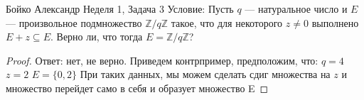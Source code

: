 \documentclass[a4paper,12pt]{article}
\numberwithin{equation}{section}
\theoremstyle{plain}
\theoremstyle{definition}
\theoremstyle{remark}
\def\Z{\mathbb {Z}}
\begin{document}

Бойко Александр
\newline
\newline
Неделя 1, Задача 3 \newline
Условие:
Пусть $q$ --- натуральное число и $E$ --- произвольное подмножество $\Z/q\Z$ такое, что для некоторого $z\neq 0$ выполнено $E+z\subseteq E$.
Верно ли, что тогда $E=\Z/q\Z$?
\begin{proof}
Ответ: нет, не верно. \newline
Приведем контрпример, предположим, что: \newline
$q = 4$ \newline
$z = 2$ \newline
$E = \{0, 2\}$ \newline
При таких данных, мы можем сделать сдиг множества на $z$ и множество перейдет само в себя и образует множество E

\end{proof}
\end{document}
